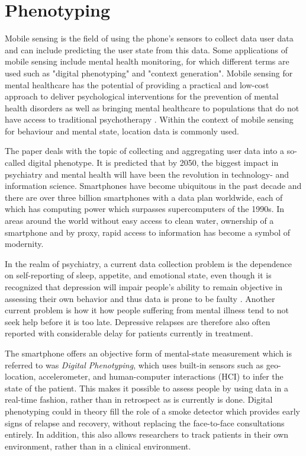 \section{Phenotyping}

Mobile sensing is the field of using the phone's sensors to collect data user data and can include predicting the user state from this data. Some applications of mobile sensing include mental health monitoring, for which different terms are used such as "digital phenotyping" and "context generation". Mobile sensing for mental healthcare has the potential of providing a practical and low-cost approach to deliver psychological interventions for the prevention of mental health disorders \cite{mobile-based-interventions} as well as bringing mental healthcare to populations that do not have access to traditional psychotherapy \cite{future-mental-health}. Within the context of mobile sensing for behaviour and mental state, location data is commonly used. 

The paper \cite{digital_phenotyping} deals with the topic of collecting and aggregating user data into a so-called digital phenotype. It is predicted that by 2050, the biggest impact in psychiatry and mental health will have been the revolution in technology- and information science. Smartphones have become ubiquitous in the past decade and there are over three billion smartphones with a data plan worldwide, each of which has computing power which surpasses supercomputers of the 1990s. In areas around the world without easy access to clean water, ownership of a smartphone and by proxy, rapid access to information has become a symbol of modernity. 

In the realm of psychiatry, a current data collection problem is the dependence on self-reporting of sleep, appetite, and emotional state, even though it is recognized that depression will impair people's ability to remain objective in assessing their own behavior and thus data is prone to be faulty \cite{digital_phenotyping}. Another current problem is how it how people suffering from mental illness tend to not seek help before it is too late. Depressive relapses are therefore also often reported with considerable delay for patients currently in treatment. 

The smartphone offers an objective form of mental-state measurement which is referred to was \textit{Digital Phenotyping}, which uses built-in sensors such as geo-location, accelerometer, and human-computer interactions (HCI) to infer the state of the patient. This makes it possible to assess people by using data in a real-time fashion, rather than in retrospect as is currently is done. Digital phenotyping could in theory fill the role of a smoke detector which provides early signs of relapse and recovery, without replacing the face-to-face consultations entirely. In addition, this also allows researchers to track patients in their own environment, rather than in a clinical environment.
